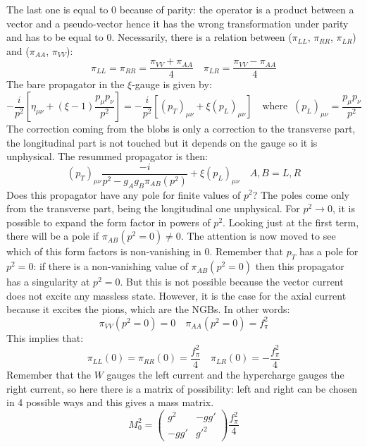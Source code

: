 \documentclass[../main.tex]{subfiles}
\begin{document}
The last one is equal to 0 because of parity: the operator is a product between a vector and a pseudo-vector hence it has the wrong transformation under parity and has to be equal to 0. Necessarily, there is a relation between ($\pi_{LL}$, $\pi_{RR}$, $\pi_{LR}$) and ($\pi_{AA}$, $\pi_{VV}$):
\[
\pi_{LL}=\pi_{RR}=\frac{\pi_{VV}+\pi_{AA}}{4} \quad \pi_{LR}=\frac{\pi_{VV}-\pi_{AA}}{4}
\]
The bare propagator in the $\xi$-gauge is given by:
\[
-\frac{i}{p^2}\left[\eta_{\mu\nu}+(\xi-1)\frac{p_\mu p_\nu}{p^2}\right]=-\frac{i}{p^2}\left[(p_T)_{\mu\nu}+\xi(p_L)_{\mu\nu}\right] \quad \text{where} \;\; (p_L)_{\mu\nu}=\frac{p_\mu p_\nu}{p^2}
\]
The correction coming from the blobs is only a correction to the transverse part, the longitudinal part is not touched but it depends on the gauge so it is unphysical. The resummed propagator is then:
\[
(p_T)_{\mu\nu}\frac{-i}{p^2-g_Ag_B\pi_{AB}(p^2)}+\xi(p_L)_{\mu\nu} \quad A,B=L,R
\]
Does this propagator have any pole for finite values of $p^2$? The poles come only from the transverse part, being the longitudinal one unphysical. For $p^2\to0$, it is possible to expand the form factor in powers of $p^2$. Looking just at the first term, there will be a pole if $\pi_{AB}(p^2=0)\neq0$. The attention is now moved to see which of this form factors is non-vanishing in 0. Remember that $p_T$ has a pole for $p^2=0$: if there is a non-vanishing value of $\pi_{AB}(p^2=0)$ then this propagator has a singularity at $p^2=0$. But this is not possible because the vector current does not excite any massless state. However, it is the case for the axial current because it excites the pions, which are the NGBs. In other words:
\[
\pi_{VV}(p^2=0)=0 \quad \pi_{AA}(p^2=0)=f^2_\pi
\]
 This implies that:
\[
\pi_{LL}(0)=\pi_{RR}(0)=\frac{f_\pi^2}{4} \quad \pi_{LR}(0)=-\frac{f_\pi^2}{4}
\]
Remember that the $W$ gauges the left current and the hypercharge gauges the right current, so here there is a matrix of possibility: left and right can be chosen in 4 possible ways and this gives a mass matrix.
\[
M_0^2=\left(\begin{array}{cc}
    g^2 & -gg' \\
    -gg' & g'^2
\end{array}\right)\frac{f_\pi^2}{4}
\]
\end{document}
